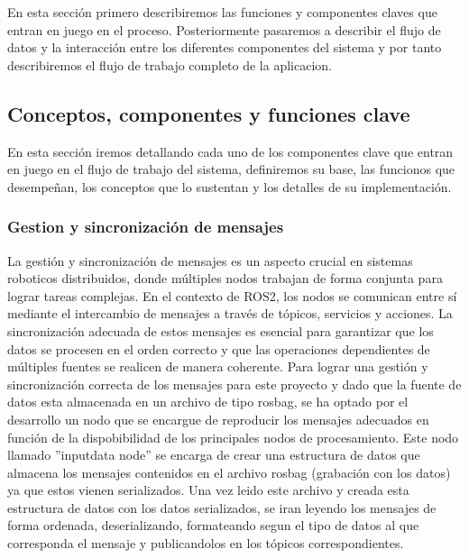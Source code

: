 \documentclass[12pt, a4paper, twoside]{article}
\begin{document}
En esta sección primero describiremos las funciones y componentes claves que entran en juego en el proceso. Posteriormente pasaremos a 
describir el flujo de datos y la interacción entre los diferentes componentes del sistema y por tanto describiremos el flujo de trabajo 
completo de la aplicacion.

\subsection{Conceptos, componentes y funciones clave}
En esta sección iremos detallando cada uno de los componentes clave que entran en juego en el flujo de trabajo del sistema, definiremos su base,
las funcionos que desempeñan, los conceptos que lo sustentan y los detalles de su implementación.

\subsubsection{Gestion y sincronización de mensajes}
La gestión y sincronización de mensajes es un aspecto crucial en sistemas roboticos distribuidos, donde múltiples nodos trabajan de forma 
conjunta para lograr tareas complejas. En el contexto de ROS2, los nodos se comunican entre sí mediante el intercambio de mensajes a
través de tópicos, servicios y acciones. La sincronización adecuada de estos mensajes es esencial para garantizar que los datos se procesen 
en el orden correcto y que las operaciones dependientes de múltiples fuentes se realicen de manera coherente. \newline
Para lograr una gestión y sincronización correcta de los mensajes para este proyecto y dado que la fuente de datos esta almacenada en un 
archivo de tipo rosbag, se ha optado por el desarrollo un nodo que se encargue de reproducir los mensajes adecuados en función de la dispobibilidad 
de los principales nodos de procesamiento.\newline
Este nodo llamado ''input\textunderscore data \textunderscore node'' se encarga de crear una estructura de datos que almacena los mensajes contenidos 
en el archivo rosbag (grabación con los datos) ya que estos vienen serializados. Una vez leido este archivo y creada esta estructura de datos con los 
datos serializados, se iran leyendo los mensajes de forma ordenada, deserializando, formateando segun el tipo de datos al que corresponda el mensaje 
y publicandolos en los tópicos correspondientes.
\end{document}
